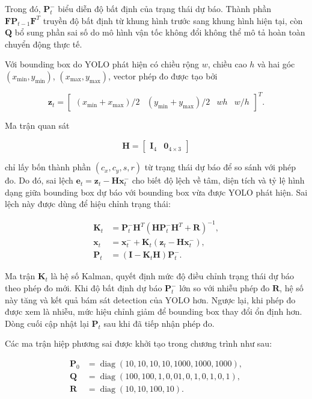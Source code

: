 Trong đó, $\mathbf{P}_{t}^{-}$ biểu diễn độ bất định của trạng thái dự báo. Thành phần $\mathbf{F}\mathbf{P}_{t-1}\mathbf{F}^{T}$ truyền độ bất định từ khung hình trước sang khung hình hiện tại, còn $\mathbf{Q}$ bổ sung phần sai số do mô hình vận tốc không đổi không thể mô tả hoàn toàn chuyển động thực tế.

Với bounding box do YOLO phát hiện có chiều rộng $w$, chiều cao $h$ và hai góc $(x_{\min},y_{\min})$, $(x_{\max},y_{\max})$, vector phép đo được tạo bởi

\[
\mathbf{z}_{t}=
\begin{bmatrix}
(x_{\min}+x_{\max})/2 &
(y_{\min}+y_{\max})/2 &
wh & w/h
\end{bmatrix}^{T}.
\]

Ma trận quan sát

\[
\mathbf{H}=\begin{bmatrix}\mathbf{I}_{4}&\mathbf{0}_{4\times3}\end{bmatrix}
\]

chỉ lấy bốn thành phần $(c_x,c_y,s,r)$ từ trạng thái dự báo để so sánh với phép đo. Do đó, sai lệch $\mathbf{e}_t=\mathbf{z}_t-\mathbf{H}\mathbf{x}_t^{-}$ cho biết độ lệch về tâm, diện tích và tỷ lệ hình dạng giữa bounding box dự báo với bounding box vừa được YOLO phát hiện. Sai lệch này được dùng để hiệu chỉnh trạng thái:

\begin{align}
\mathbf{K}_{t}&=\mathbf{P}_{t}^{-}\mathbf{H}^{T}
\left(\mathbf{H}\mathbf{P}_{t}^{-}\mathbf{H}^{T}+\mathbf{R}\right)^{-1},\\
\mathbf{x}_{t}&=\mathbf{x}_{t}^{-}+\mathbf{K}_{t}
\left(\mathbf{z}_{t}-\mathbf{H}\mathbf{x}_{t}^{-}\right),\\
\mathbf{P}_{t}&=\left(\mathbf{I}-\mathbf{K}_{t}\mathbf{H}\right)\mathbf{P}_{t}^{-}.
\label{eq:kalman_tracking_update}
\end{align}

Ma trận $\mathbf{K}_t$ là hệ số Kalman, quyết định mức độ điều chỉnh trạng thái dự báo theo phép đo mới. Khi độ bất định dự báo $\mathbf{P}_t^{-}$ lớn so với nhiễu phép đo $\mathbf{R}$, hệ số này tăng và kết quả bám sát detection của YOLO hơn. Ngược lại, khi phép đo được xem là nhiễu, mức hiệu chỉnh giảm để bounding box thay đổi ổn định hơn. Dòng cuối cập nhật lại $\mathbf{P}_t$ sau khi đã tiếp nhận phép đo.

Các ma trận hiệp phương sai được khởi tạo trong chương trình như sau:

\[
\begin{aligned}
\mathbf{P}_0&=\operatorname{diag}(10,10,10,10,1000,1000,1000),\\
\mathbf{Q}&=\operatorname{diag}(100,100,1,0{,}01,0{,}1,0{,}1,0{,}1),\\
\mathbf{R}&=\operatorname{diag}(10,10,100,10).
\end{aligned}
\]

